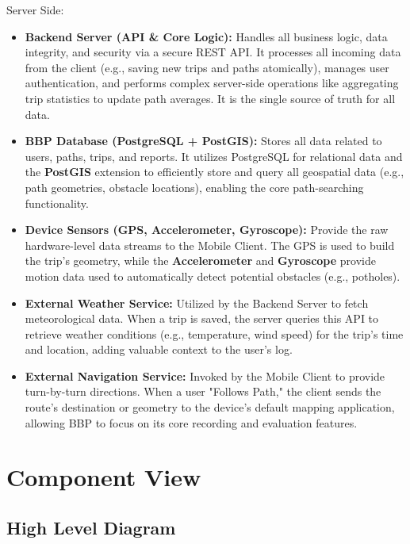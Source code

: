\noindent Server Side:
\begin{itemize}
    \item \textbf{Backend Server (API \& Core Logic):} Handles all business logic, data integrity, and security via a secure REST API. It processes all incoming data from the client (e.g., saving new trips and paths atomically), manages user authentication, and performs complex server-side operations like aggregating trip statistics to update path averages. It is the single source of truth for all data.
    
    \item \textbf{BBP Database (PostgreSQL + PostGIS):} Stores all data related to users, paths, trips, and reports. It utilizes PostgreSQL for relational data and the \textbf{PostGIS} extension to efficiently store and query all geospatial data (e.g., path geometries, obstacle locations), enabling the core path-searching functionality.
    
    \item \textbf{Device Sensors (GPS, Accelerometer, Gyroscope):} Provide the raw hardware-level data streams to the Mobile Client. The GPS is used to build the trip's geometry, while the \textbf{Accelerometer} and \textbf{Gyroscope} provide motion data used to automatically detect potential obstacles (e.g., potholes).
    
    \item \textbf{External Weather Service:} Utilized by the Backend Server to fetch meteorological data. When a trip is saved, the server queries this API to retrieve weather conditions (e.g., temperature, wind speed) for the trip's time and location, adding valuable context to the user's log.
    
    \item \textbf{External Navigation Service:} Invoked by the Mobile Client to provide turn-by-turn directions. When a user "Follows Path," the client sends the route's destination or geometry to the device's default mapping application, allowing BBP to focus on its core recording and evaluation features.
\end{itemize}

\section{Component View}
\label{sec:component_view}%

\subsection{High Level Diagram}
\label{subsec:high_level_diagram}%

